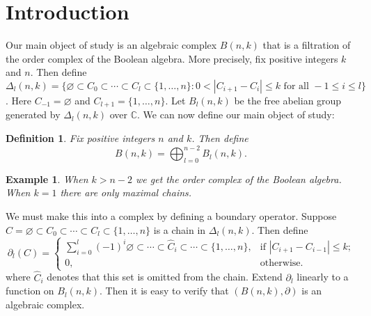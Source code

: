 \documentclass{amsart}
\newtheorem{definition}[theorem]{Definition}
\newtheorem{example}[theorem]{Example}
\newcommand{\C}{\mathbb{C}}
\newcommand{\full}{\{1, \ldots, n\}}
\begin{document}
\section{Introduction}\label{S:intro}

  Our main object of study is an algebraic complex $B(n, k)$ that is a filtration of the order complex of the 
Boolean algebra. More precisely, fix positive integers $k$ and $n$. Then define 
  $\Delta_l(n, k) = \{\varnothing \subset C_0 \subset \cdots \subset C_l \subset \{1, \ldots, n\}
  \colon 0 < |C_{i+1} - C_i| \le k 
  \mbox{ for all } -1 \le i \le l \}$. Here $C_{-1} = \varnothing$ and $C_{l+1} = \full$. Let $B_l(n, k)$ be the free abelian group generated by $\Delta_l(n, k)$ over $\C$.
We can now define our main object of study: 
\begin{definition}\label{:B(n,k)} Fix positive integers $n$ and $k$. Then define
  \begin{equation}
    B(n, k) = \bigoplus_{l=0}^{n-2} B_l(n, k).
  \end{equation}
\end{definition}
\begin{example} When $k > n-2$ we get the order complex of the Boolean algebra. When $k=1$ there are only maximal chains.
\end{example}
We must make this into a complex by defining a boundary operator. Suppose $C = \varnothing \subset C_0 \subset  \cdots
\subset C_l \subset \{1, \ldots, n\}$ is a chain in $\Delta_l(n, k)$.
Then define
\begin{equation}\label{E:delta}
  \partial_l(C) = 
  \begin{cases}
     \sum_{i=0}^l (-1)^i \varnothing \subset \cdots \subset {\hat C_i} \subset \cdots  \subset \full, 
	 &\text{if $|C_{i+1} - C_{i-1}| \le k$;}\\
     0, &\text{otherwise.}
  \end{cases}
\end{equation} where ${\hat C_i}$ denotes that this set is omitted from the chain. 
Extend $\partial_l$ linearly to a function on $B_l(n, k)$. Then it is easy to verify that $(B(n, k), \partial)$
is an algebraic complex.  
\end{document}
